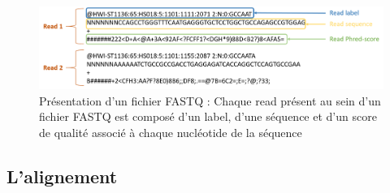 \documentclass[12pt,twoside]{reedthesis}
\theoremstyle{definition}
\theoremstyle{definition}
\theoremstyle{remark}
\begin{document}
  \begin{figure}
  
  {\centering \includegraphics[scale=.36]{figure/fastq} 
  
  }
  
  \caption[Présentation d'un fichier FASTQ]{Présentation d'un fichier FASTQ : Chaque read présent au sein d'un fichier FASTQ est composé d'un label, d'une séquence et d'un score de qualité associé à chaque nucléotide de la séquence}\label{fig:fastqformat}
  \end{figure}
  
  \newpage
  
  \hypertarget{lalignement}{\subsection{L'alignement}\label{lalignement}}
  
\end{document}
